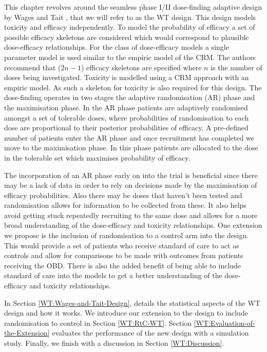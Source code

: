 This chapter revolves around the seamless phase \RN{1}/\RN{2} dose-finding adaptive design by Wages and Tait \cite{wagesSeamlessPhaseII2015}, that we will refer to as the WT design. This design models toxicity and efficacy independently. To model the probability of efficacy a set of possible efficacy skeletons are considered which would correspond to plausible dose-efficacy relationships. For the class of dose-efficacy models a single parameter model is used similar to the empiric model of the CRM. The authors recommend that ($2n - 1$) efficacy skeletons are specified where $n$ is the number of doses being investigated. Toxicity is modelled using a CRM approach with an empiric model. As such a skeleton for toxicity is also required for this design. The dose-finding operates in two stages the adaptive randomisation (AR) phase and the maximisation phase. In the AR phase patients are adaptively randomised amongst a set of tolerable doses, where probabilities of randomisation to each dose are proportional to their posterior probabilities of efficacy. A pre-defined number of patients enter the AR phase and once recruitment has completed we move to the maximisation phase. In this phase patients are allocated to the dose in the tolerable set which maximises probability of efficacy.  

The incorporation of an AR phase early on into the trial is beneficial since there may be a lack of data in order to rely on decisions made by the maximisation of efficacy probabilities. Also there may be doses that haven't been tested and randomisation allows for information to be collected from these. It also helps avoid getting stuck repeatedly recruiting to the same dose and allows for a more broad understanding of the dose-efficacy and toxicity relationships. One extension we propose is the inclusion of randomisation to a control arm into the design. This would provide a set of patients who receive standard of care to act as controls and allow for comparisons to be made with outcomes from patients receiving the OBD. There is also the added benefit of being able to include standard of care into the models to get a better understanding of the dose-efficacy and toxicity relationships.  

In Section \ref{WT:Wages-and-Tait-Design}, details the statistical aspects of the WT design and how it works. We introduce our extension to the design to include randomisation to control in Section \ref{WT:RtC-WT}. Section \ref{WT:Evaluation-of-the-Extension} evaluates the performance of the new design with a simulation study. Finally, we finish with a discussion in Section \ref{WT:Discussion}.  


